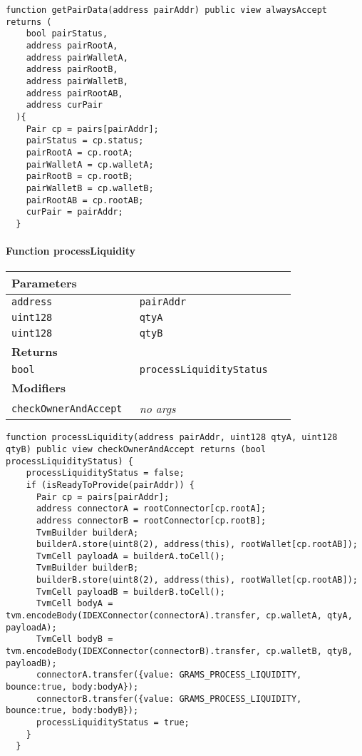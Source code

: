 \vspace{2cm}

\begin{lstlisting}[firstnumber=379]
  function getPairData(address pairAddr) public view alwaysAccept returns (
    bool pairStatus,
    address pairRootA,
    address pairWalletA,
    address pairRootB,
    address pairWalletB,
    address pairRootAB,
    address curPair
  ){
    Pair cp = pairs[pairAddr];
    pairStatus = cp.status;
    pairRootA = cp.rootA;
    pairWalletA = cp.walletA;
    pairRootB = cp.rootB;
    pairWalletB = cp.walletB;
    pairRootAB = cp.rootAB;
    curPair = pairAddr;
  }
\end{lstlisting}

\paragraph{Function processLiquidity}


\ifsoltables
\noindent\begin{tabular}{|l|l|p{5cm}|}\hline
\multicolumn{3}{|l|}{\bf Parameters}\\\hline
\tt address & \tt pairAddr &\\\hline
\tt uint128 & \tt qtyA &\\\hline
\tt uint128 & \tt qtyB &\\\hline
\multicolumn{3}{|l|}{\bf Returns}\\\hline
\tt bool & \tt processLiquidityStatus &\\\hline
\multicolumn{3}{|l|}{\bf Modifiers}\\\hline
\tt checkOwnerAndAccept & {\em no args} &\\\hline
\end{tabular}
\fi

\vspace{2cm}

\begin{lstlisting}[firstnumber=251]
  function processLiquidity(address pairAddr, uint128 qtyA, uint128 qtyB) public view checkOwnerAndAccept returns (bool processLiquidityStatus) {
    processLiquidityStatus = false;
    if (isReadyToProvide(pairAddr)) {
      Pair cp = pairs[pairAddr];
      address connectorA = rootConnector[cp.rootA];
      address connectorB = rootConnector[cp.rootB];
      TvmBuilder builderA;
      builderA.store(uint8(2), address(this), rootWallet[cp.rootAB]);
      TvmCell payloadA = builderA.toCell();
      TvmBuilder builderB;
      builderB.store(uint8(2), address(this), rootWallet[cp.rootAB]);
      TvmCell payloadB = builderB.toCell();
      TvmCell bodyA = tvm.encodeBody(IDEXConnector(connectorA).transfer, cp.walletA, qtyA, payloadA);
      TvmCell bodyB = tvm.encodeBody(IDEXConnector(connectorB).transfer, cp.walletB, qtyB, payloadB);
      connectorA.transfer({value: GRAMS_PROCESS_LIQUIDITY, bounce:true, body:bodyA});
      connectorB.transfer({value: GRAMS_PROCESS_LIQUIDITY, bounce:true, body:bodyB});
      processLiquidityStatus = true;
    }
  }
\end{lstlisting}

